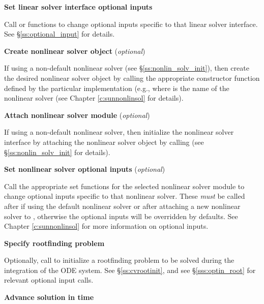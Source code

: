\begin{Steps}

\item
  {\bf Set linear solver interface optional inputs}

  Call  or  functions to change optional
  inputs specific to that linear solver interface.
  See \S\ref{ss:optional_input} for details.

\item\label{i:nonlin_solver}
  {\bf Create nonlinear solver object} (\textit{optional})

  If using a non-default nonlinear solver (see \S\ref{ss:nonlin_solv_init}),
  then create the desired nonlinear solver object by calling the appropriate
  constructor function defined by the particular {\sunnonlinsol} implementation
  (e.g.,  where \id{***} is the name of the
  nonlinear solver (see Chapter \ref{c:sunnonlinsol} for details).

\item\label{i:nonlin_solver_interface}
  {\bf Attach nonlinear solver module} (\textit{optional})

  If using a non-default nonlinear solver, then initialize the nonlinear solver
  interface by attaching the nonlinear solver object by calling
   (see
  \S\ref{ss:nonlin_solv_init} for details).

\item
  {\bf Set nonlinear solver optional inputs} (\textit{optional})

  Call the appropriate set functions for the selected nonlinear solver module to
  change optional inputs specific to that nonlinear solver. These \textit{must}
  be called after  if using the default nonlinear solver or after
  attaching a new nonlinear solver to {\cvode}, otherwise the optional inputs
  will be overridden by {\cvode} defaults. See Chapter \ref{c:sunnonlinsol} for
  more information on optional inputs.

\item
  {\bf Specify rootfinding problem}

  Optionally, call  to initialize a rootfinding problem
  to be solved during the integration of the ODE system.
  See \S\ref{ss:cvrootinit}, and see \S\ref{sss:optin_root} for
  relevant optional input calls.

\item
  {\bf Advance solution in time}


\end{Steps}

